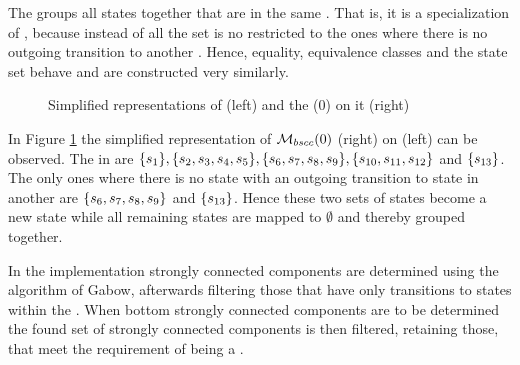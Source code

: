 \documentclass[preview]{standalone}
\begin{document}
The \viewN \viewbscc groups all states together that are in the same \bsccN. That is, it is a specialization of \viewscc, because instead of all \sccsN the set is no restricted to the ones where there is no outgoing transition to another \sccN. Hence, equality, equivalence classes and the state set behave and are constructed very similarly.

\begin{figure}[h]
	\begin{minipage}{.55\textwidth}
		\hspace{5mm}
		
	\end{minipage}
	\begin{minipage}{.5\textwidth}		
		
	\end{minipage}
	\caption{Simplified representations of \mdp (left) and the \viewN \viewbscc(0) on it (right)}
	\label{fig:bsccAfter}  
\end{figure}

In Figure \ref{fig:bsccAfter} the simplified representation of ${{{{{\mathcal{M}}}}_{{bscc}}}}(0)$ (right) on \chgph (left) can be observed. The \sccsN in \chgph are $\{{s}_1\}, \{{s}_2, {s}_3, {s}_4, {s}_5\}, \{{s}_6, {s}_7, {s}_8, {s}_9\}, \{{s}_{10}, {s}_{11}, {s}_{12}\}$ and $\{{s}_{13}\}$. The only ones where there is no state with an outgoing transition to state in another \sccN are $\{{s}_6, {s}_7, {s}_8, {s}_9\}$ and $\{{s}_{13}\}$. Hence these two sets of states become a new state \viewbscc while all remaining states are mapped to $\emptyset$ and thereby grouped together.

In the implementation strongly connected components are determined using the algorithm of Gabow, afterwards filtering those \sccsN that have only transitions to states within the \sccN. When bottom strongly connected components are to be determined the found set of strongly connected components is then filtered, retaining those, that meet the requirement of being a \bsccN.
	
\end{document}
